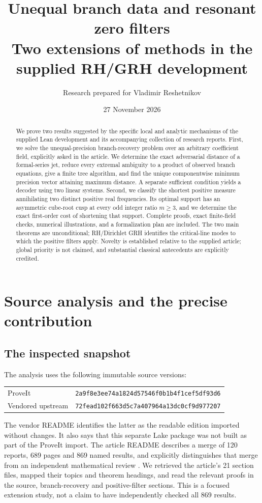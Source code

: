 \documentclass[11pt]{article}
\title{\textbf{Unequal branch data and resonant zero filters}\\[5pt]
\large Two extensions of methods in the supplied RH/GRH development}
\author{Research prepared for Vladimir Reshetnikov}
\date{27 November 2026}
\theoremstyle{definition}\newtheorem{definition}[theorem]{Definition}
\theoremstyle{remark}\newtheorem{remark}[theorem]{Remark}
\begin{document}
\maketitle
\begin{abstract}
We prove two results suggested by the specific local and analytic mechanisms
of the supplied Lean development and its accompanying collection of research
reports. First, we solve the unequal-precision branch-recovery problem over
an arbitrary coefficient field, explicitly asked in the article. We determine
the exact adversarial distance of a formal-series jet, reduce every extremal
ambiguity to a product of observed branch equations, give a finite tree
algorithm, and find the unique componentwise minimum precision vector attaining
maximum distance. A separate sufficient condition yields a decoder using two
linear systems. Second, we classify the shortest positive measure annihilating
two distinct positive real frequencies. Its optimal support has an asymmetric cube-root
cusp at every odd integer ratio $m\ge3$, and we determine the exact first-order cost of
shortening that support. Complete proofs, exact finite-field checks, numerical
illustrations, and a formalization plan are included. The two main theorems
are unconditional; RH/Dirichlet GRH identifies the critical-line modes to which
the positive filters apply. Novelty is established relative to the supplied
article; global priority is not claimed, and substantial classical antecedents
are explicitly credited.
\end{abstract}
\setcounter{tocdepth}{1}
\hypersetup{bookmarksdepth=2}
\tableofcontents
\newpage

\section{Source analysis and the precise contribution}
\label{sec:sources}

\subsection{The inspected snapshot}

The analysis uses the following immutable source versions:
\begin{center}
\begin{tabular}{ll}
\toprule
ProveIt & \texttt{2a9f8e3ee74a1824d57546f0b1b4f1cef5df93d6}\\
Vendored upstream & \texttt{72fead102f663d5c7a407964a13dc0cf9d977207}\\
\bottomrule
\end{tabular}
\end{center}
The vendor README identifies the latter as the readable edition imported
without changes. It also says that this separate Lake package was not built
as part of the ProveIt import. The article README describes a merge of 120
reports, 689 pages and 869 named results, and explicitly distinguishes that
merge from an independent mathematical review \cite{Source,Vendor}.
We retrieved the article's 21 section files, mapped their topics and theorem
headings, and read the relevant proofs in the source, branch-recovery and
positive-filter sections. This is a focused extension study, not a claim to
have independently checked all 869 results.
\end{document}
